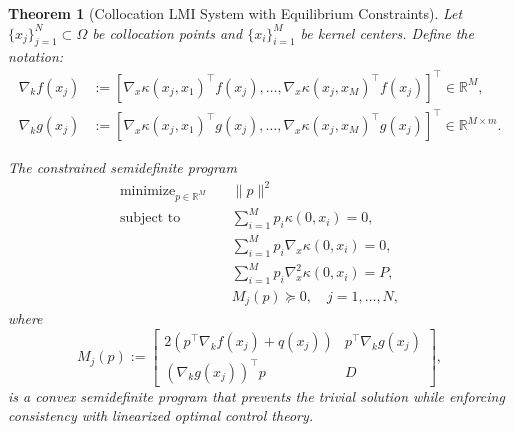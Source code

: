 \documentclass[10pt,a4paper]{amsart}
\newtheorem{theorem}{Theorem}
\newcommand{\minimize}{\text{minimize}}
\newcommand{\real}{\mathbb{R}}
\begin{document}
\begin{theorem}[Collocation LMI System with Equilibrium Constraints]
\label{thm:collocation}
Let $\{x_j\}_{j=1}^N \subset \Omega$ be collocation points and $\{x_i\}_{i=1}^M$ be kernel centers. Define the notation:
\begin{align*}
\nabla_k f(x_j) &:= [\nabla_x \kappa(x_j, x_1)^\top f(x_j), \ldots, \nabla_x \kappa(x_j, x_M)^\top f(x_j)]^\top \in \real^M, \\
\nabla_k g(x_j) &:= [\nabla_x \kappa(x_j, x_1)^\top g(x_j), \ldots, \nabla_x \kappa(x_j, x_M)^\top g(x_j)]^\top \in \real^{M \times m}.
\end{align*}

The constrained semidefinite program
\begin{subequations}
\begin{align}
\minimize_{p \in \real^M} \quad & \|p\|^2 \label{eq:sdp_obj} \\
\text{subject to} \quad & \sum_{i=1}^M p_i \kappa(0, x_i) = 0, \label{eq:sdp_boundary} \\
& \sum_{i=1}^M p_i \nabla_x \kappa(0, x_i) = 0, \label{eq:sdp_gradient} \\
& \sum_{i=1}^M p_i \nabla_x^2 \kappa(0, x_i) = P, \label{eq:sdp_hessian} \\
& M_j(p) \succeq 0, \quad j = 1, \ldots, N, \label{eq:sdp_lmi}
\end{align}
\label{eq:sdp}
\end{subequations}
where
\begin{equation}
M_j(p) := \begin{bmatrix}
2(p^\top \nabla_k f(x_j) + q(x_j)) & p^\top \nabla_k g(x_j) \\
(\nabla_k g(x_j))^\top p & D
\end{bmatrix},
\label{eq:Mj_matrix}
\end{equation}
is a convex semidefinite program that prevents the trivial solution while enforcing consistency with linearized optimal control theory.
\end{theorem}
\end{document}
